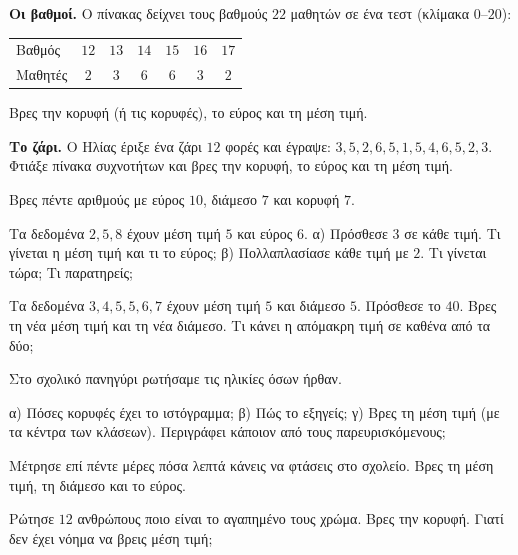 \ex \textbf{Οι βαθμοί.} Ο πίνακας δείχνει τους βαθμούς $22$ μαθητών σε ένα τεστ (κλίμακα $0$--$20$):\par
\begin{center}
\renewcommand{\arraystretch}{1.25}
\begin{tabular}{lcccccc}
\toprule
Βαθμός & $12$ & $13$ & $14$ & $15$ & $16$ & $17$\\
Μαθητές & $2$ & $3$ & $6$ & $6$ & $3$ & $2$\\
\bottomrule
\end{tabular}
\end{center}
Βρες την κορυφή (ή τις κορυφές), το εύρος και τη μέση τιμή.

\ex \textbf{Το ζάρι.} Ο Ηλίας έριξε ένα ζάρι $12$ φορές και έγραψε: $3,5,2,6,5,1,5,4,6,5,2,3$. Φτιάξε πίνακα συχνοτήτων και βρες την κορυφή, το εύρος και τη μέση τιμή.


\ex Βρες πέντε αριθμούς με εύρος $10$, διάμεσο $7$ και κορυφή $7$.

\ex Τα δεδομένα $2, 5, 8$ έχουν μέση τιμή $5$ και εύρος $6$. α) Πρόσθεσε $3$ σε κάθε τιμή. Τι γίνεται η μέση τιμή και τι το εύρος; β) Πολλαπλασίασε κάθε τιμή με $2$. Τι γίνεται τώρα; Τι παρατηρείς;

\ex Τα δεδομένα $3,4,5,5,6,7$ έχουν μέση τιμή $5$ και διάμεσο $5$. Πρόσθεσε το $40$. Βρες τη νέα μέση τιμή και τη νέα διάμεσο. Τι κάνει η απόμακρη τιμή σε καθένα από τα δύο;

\ex Στο σχολικό πανηγύρι ρωτήσαμε τις ηλικίες όσων ήρθαν.
\begin{center}
\end{center}
α) Πόσες κορυφές έχει το ιστόγραμμα; β) Πώς το εξηγείς; γ) Βρες τη μέση τιμή (με τα κέντρα των κλάσεων). Περιγράφει κάποιον από τους παρευρισκόμενους;


\ex Μέτρησε επί πέντε μέρες πόσα λεπτά κάνεις να φτάσεις στο σχολείο. Βρες τη μέση τιμή, τη διάμεσο και το εύρος.

\ex Ρώτησε $12$ ανθρώπους ποιο είναι το αγαπημένο τους χρώμα. Βρες την κορυφή. Γιατί δεν έχει νόημα να βρεις μέση τιμή;

